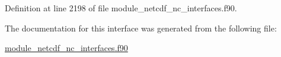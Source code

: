 Definition at line 2198 of file module\+\_\+netcdf\+\_\+nc\+\_\+interfaces.\+f90.



The documentation for this interface was generated from the following file\+:\begin{DoxyCompactItemize}
\item 
\hyperlink{module__netcdf__nc__interfaces_8f90}{module\+\_\+netcdf\+\_\+nc\+\_\+interfaces.\+f90}\end{DoxyCompactItemize}
